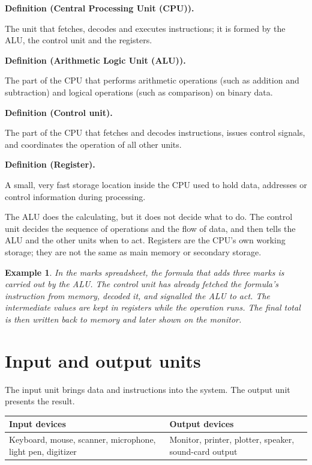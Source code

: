 \documentclass[11pt]{article}
\newtheorem{example}{Example}[section]
\newenvironment{definitionbox}[1]{%
  \par\noindent\textbf{Definition (#1).}\ \itshape
}{\par\vspace{0.3em}}
\begin{document}
\begin{definitionbox}{Central Processing Unit (CPU)}
The unit that fetches, decodes and executes instructions; it is formed by the
ALU, the control unit and the registers.
\end{definitionbox}

\begin{definitionbox}{Arithmetic Logic Unit (ALU)}
The part of the CPU that performs arithmetic operations (such as addition and
subtraction) and logical operations (such as comparison) on binary data.
\end{definitionbox}

\begin{definitionbox}{Control unit}
The part of the CPU that fetches and decodes instructions, issues control
signals, and coordinates the operation of all other units.
\end{definitionbox}

\begin{definitionbox}{Register}
A small, very fast storage location inside the CPU used to hold data,
addresses or control information during processing.
\end{definitionbox}

The ALU does the calculating, but it does not decide what to do. The control
unit decides the sequence of operations and the flow of data, and then tells
the ALU and the other units when to act. Registers are the CPU's own working
storage; they are not the same as main memory or secondary storage.

\begin{example}
In the marks spreadsheet, the formula that adds three marks is carried out by
the ALU. The control unit has already fetched the formula's instruction from
memory, decoded it, and signalled the ALU to act. The intermediate values are
kept in registers while the operation runs. The final total is then written
back to memory and later shown on the monitor.
\end{example}

\section{Input and output units}
The input unit brings data and instructions into the system. The output unit
presents the result.

\begin{center}
\begin{tabular}{p{}p{}}
\toprule
\textbf{Input devices} & \textbf{Output devices}\\
\midrule
Keyboard, mouse, scanner, microphone, light pen, digitizer & Monitor,
printer, plotter, speaker, sound-card output\\
\bottomrule
\end{tabular}
\end{center}
\end{document}

